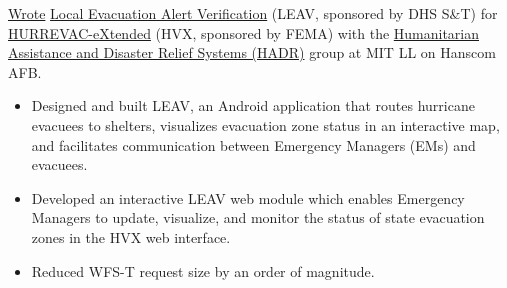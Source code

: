 \documentclass[]{article}
\begin{document}
\vspace{5pt}
\href{https://docs.google.com/presentation/d/1d6u7eK2fBJElrRpEn1KlkTfReKO_tHj5iCAGb6vgtmg}{Wrote} \href{https://www.dhs.gov/publication/national-hurricane-program-technology-modernization-local-evacuation-alert-verification}{Local Evacuation Alert Verification} (LEAV, sponsored by DHS S\&T) for \href{https://www.dhs.gov/publication/national-hurricane-program-technology-modernization-hurrevac-extended-hv-x}{HURREVAC-eXtended} (HVX, sponsored by FEMA) with the \href{https://www.ll.mit.edu/r-d/biotechnology-and-human-systems/humanitarian-assistance-and-disaster-relief-systems}{Humanitarian Assistance and Disaster Relief Systems (HADR)} group at MIT LL on Hanscom AFB.


\begin{minipage}[t]{0.48\linewidth}
	\begin{itemize}

		\item Designed and built LEAV, an Android application that routes hurricane evacuees to shelters, visualizes evacuation zone status in an interactive map, and facilitates communication between Emergency Managers (EMs) and evacuees.
	\end{itemize}
\end{minipage}
\hfill
\begin{minipage}[t]{0.48\linewidth}
	\begin{itemize}
		\item Developed an interactive LEAV web module which enables Emergency Managers to update, visualize, and monitor the status of state evacuation zones in the HVX web interface.
		\item Reduced WFS-T request size by an order of magnitude.
	\end{itemize}
\end{minipage}

\vspace{3pt}
\end{document}

